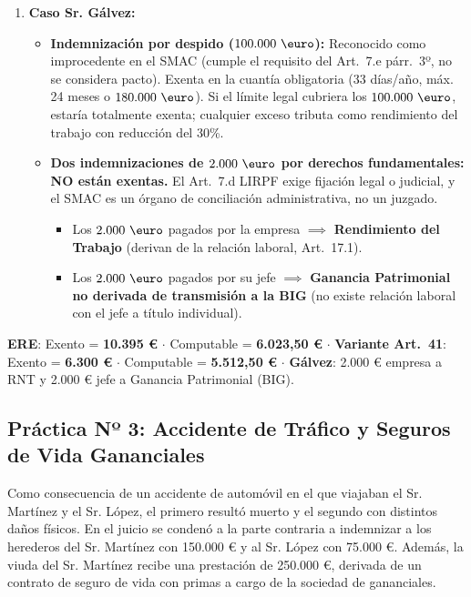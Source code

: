 \documentclass[11pt,a4paper,openany]{article}
\begin{document}
\begin{solucionBox}
\begin{enumerate}[label=\textbf{\arabic*.}]
    \item \textbf{Caso Sr. Gálvez:}
    \begin{itemize}
        \item \textbf{Indemnización por despido ($100.000\text{ \euro}$):} Reconocido como improcedente en el SMAC (cumple el requisito del Art.~7.e párr.~3º, no se considera pacto). Exenta en la cuantía obligatoria (33 días/año, máx. 24 meses o $180.000\text{ \euro}$). Si el límite legal cubriera los $100.000\text{ \euro}$, estaría totalmente exenta; cualquier exceso tributa como rendimiento del trabajo con reducción del 30\%.
        \item \textbf{Dos indemnizaciones de $2.000\text{ \euro}$ por derechos fundamentales:} \textbf{NO están exentas.} El Art.~7.d LIRPF exige fijación legal o judicial, y el SMAC es un órgano de conciliación administrativa, no un juzgado.
        \begin{itemize}
            \item Los $2.000\text{ \euro}$ pagados por la empresa $\implies$ \textbf{Rendimiento del Trabajo} (derivan de la relación laboral, Art.~17.1).
            \item Los $2.000\text{ \euro}$ pagados por su jefe $\implies$ \textbf{Ganancia Patrimonial no derivada de transmisión a la BIG} (no existe relación laboral con el jefe a título individual).
        \end{itemize}
    \end{itemize}
\end{enumerate}
\end{solucionBox}

\begin{resultadoBox}
\textbf{ERE}: Exento = \textbf{10.395 \euro} $\cdot$ Computable = \textbf{6.023,50 \euro} $\cdot$ \textbf{Variante Art.~41}: Exento = \textbf{6.300 \euro} $\cdot$ Computable = \textbf{5.512,50 \euro} $\cdot$ \textbf{Gálvez}: 2.000 \euro{} empresa a RNT y 2.000 \euro{} jefe a Ganancia Patrimonial (BIG).
\end{resultadoBox}

\vspace{0.4cm}

\subsection{Práctica Nº 3: Accidente de Tráfico y Seguros de Vida Gananciales}

\begin{enunciadoBox}
Como consecuencia de un accidente de automóvil en el que viajaban el Sr. Martínez y el Sr. López, el primero resultó muerto y el segundo con distintos daños físicos. En el juicio se condenó a la parte contraria a indemnizar a los herederos del Sr. Martínez con 150.000 \euro{} y al Sr. López con 75.000 \euro{}. Además, la viuda del Sr. Martínez recibe una prestación de 250.000 \euro{}, derivada de un contrato de seguro de vida con primas a cargo de la sociedad de gananciales.
\end{enunciadoBox}
\end{document}
